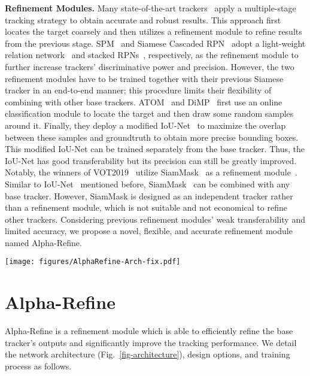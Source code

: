 \documentclass[final]{cvpr}
\begin{document}
{\noindent \textbf{Refinement Modules.}} 
Many state-of-the-art trackers~\cite{SPM,CascadedSiameseRPN,ATOM,DiMP,VOT2019} apply a multiple-stage 
tracking strategy to obtain accurate and robust results. 
This approach first locates the target coarsely and then utilizes a refinement module to refine results from 
the previous stage. 
SPM~\cite{SPM} and Siamese Cascaded RPN~\cite{CascadedSiameseRPN} adopt a light-weight relation 
network~\cite{RelationNet} and stacked RPNs~\cite{FasterRCNN}, respectively, as the refinement module 
to further increase trackers' discriminative power and precision. 
However, the two refinement modules have to be trained together with their previous Siamese tracker 
in an end-to-end manner; this procedure limits their flexibility of combining with other base trackers. 
ATOM~\cite{ATOM} and DiMP~\cite{DiMP} first use an online classification module to locate the target 
and then draw some random samples around it. 
Finally, they deploy a modified IoU-Net~\cite{IOU-Net} to 
maximize the overlap between these samples and groundtruth to obtain more precise bounding boxes. 
This modified IoU-Net can be trained separately from the base tracker. 
Thus, the IoU-Net has good transferability but its precision can still be greatly improved. 
Notably, the winners of VOT2019~\cite{VOT2019} utilize 
SiamMask~\cite{SiamMask} as a refinement module~\cite{VOT2019}. 
Similar to IoU-Net~\cite{IOU-Net} mentioned before, SiamMask~\cite{SiamMask} can be combined 
with any base tracker. 
However, SiamMask is designed as an independent tracker rather than a refinement module, 
which is not suitable and not economical to refine other trackers. 
Considering previous refinement modules' weak transferability and limited accuracy, 
we propose a novel, flexible, and accurate refinement module named Alpha-Refine. 

\begin{figure*}[t]
    \begin{center}
    \texttt{[image: figures/AlphaRefine-Arch-fix.pdf]}
    \end{center}
    \vspace{-1mm}
    \caption{Overall architecture of the proposed Alpha-Refine. Better viewed in color with zoom-in.}
    \label{fig-architecture}
\end{figure*}

\section{Alpha-Refine}\label{sec:method}
Alpha-Refine is a refinement module which is able to efficiently refine the base tracker's outputs and significantly improve the tracking performance. 
We detail the network architecture (Fig.~\ref{fig-architecture}), design options, and training process as follows. 
\end{document}
